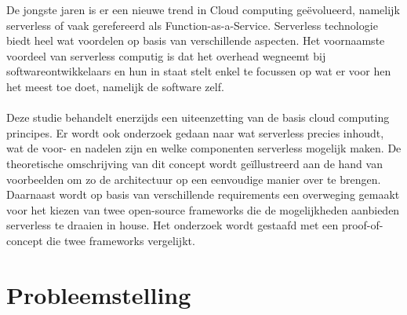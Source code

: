 De jongste jaren is er een nieuwe trend in Cloud computing geëvolueerd, namelijk serverless of vaak gerefereerd als Function-as-a-Service. Serverless technologie biedt heel wat voordelen op basis van verschillende aspecten. Het voornaamste voordeel van serverless computig is dat het overhead wegneemt bij softwareontwikkelaars en hun in staat stelt enkel te focussen op wat er voor hen het meest toe doet, namelijk de software zelf.
\\\\

Deze studie behandelt enerzijds een uiteenzetting van de basis cloud computing principes. Er wordt ook onderzoek gedaan naar wat serverless precies inhoudt, wat de voor- en nadelen zijn en welke componenten serverless mogelijk maken. De theoretische omschrijving van dit concept wordt geïllustreerd aan de hand van voorbeelden om zo de architectuur op een eenvoudige manier over te brengen. Daarnaast wordt op basis van verschillende requirements een overweging gemaakt voor het kiezen van twee open-source frameworks die de mogelijkheden aanbieden serverless te draaien in house. Het onderzoek wordt gestaafd met een proof-of-concept die twee frameworks vergelijkt.


\section{Probleemstelling}
\label{sec:probleemstelling}


